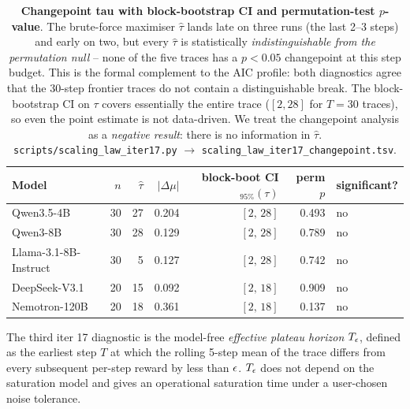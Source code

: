 \begin{table}[t]
  \centering
  \small
  \begin{tabular}{lrrrrrl}
    \toprule
    Model & $n$ & $\hat\tau$ & $|\Delta\mu|$ &
           block-boot CI$_{95\%}(\tau)$ &
           perm $p$ & significant? \\
    \midrule
    Qwen3.5-4B            & 30 & 27 & 0.204 & $[2,\,28]$  & 0.493 & no \\
    Qwen3-8B              & 30 & 28 & 0.129 & $[2,\,28]$  & 0.789 & no \\
    Llama-3.1-8B-Instruct & 30 &  5 & 0.127 & $[2,\,28]$  & 0.742 & no \\
    DeepSeek-V3.1         & 20 & 15 & 0.092 & $[2,\,18]$  & 0.909 & no \\
    Nemotron-120B         & 20 & 18 & 0.361 & $[2,\,18]$  & 0.137 & no \\
    \bottomrule
  \end{tabular}
  \caption{\textbf{Changepoint tau with block-bootstrap CI and
    permutation-test $p$-value}.  The brute-force maximiser
    $\hat\tau$ lands late on three runs (the last 2--3 steps)
    and early on two, but every $\hat\tau$ is
    statistically \emph{indistinguishable from the permutation
    null} -- none of the five traces has a
    $p < 0.05$ changepoint at this step budget.  This is the
    formal complement to the AIC profile: both diagnostics agree
    that the 30-step frontier traces do not contain a
    distinguishable break.  The block-bootstrap CI on $\tau$
    covers essentially the entire trace ($[2, 28]$ for $T = 30$
    traces), so even the point estimate is not data-driven.  We
    treat the changepoint analysis as a \emph{negative result}:
    there is no information in $\hat\tau$.
    \texttt{scripts/scaling\_law\_iter17.py} $\to$
    \texttt{scaling\_law\_iter17\_changepoint.tsv}.}
  \label{tab:scaling-iter17-changepoint}
\end{table}

The third iter 17 diagnostic is the model-free
\emph{effective plateau horizon} $T_{\epsilon}$, defined as the
earliest step $T$ at which the rolling 5-step mean of the trace
differs from every subsequent per-step reward by less than
$\epsilon$.  $T_{\epsilon}$ does not depend on the saturation model and
gives an operational saturation time under a user-chosen
noise tolerance.

